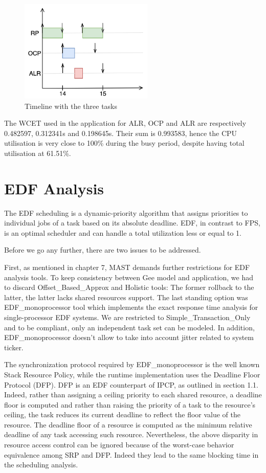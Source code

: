 \documentclass{article}
\begin{document}
\begin{figure}[!htbp]
\centering
\includegraphics[width=2.5in]{images/critical-instant}
\caption{Timeline with the three tasks}
\label{critical-instant}
\end{figure}

The WCET used in the application for ALR, OCP and ALR are respectively 0.482597, 0.312341s and 0.198645s. Their sum is 0.993583, hence the CPU utilisation is very close to 100\% during the busy period, despite having total utilisation at 61.51\%.

\section{EDF Analysis}

The EDF scheduling is a dynamic-priority algorithm that assigns priorities to individual jobs of a task based on its absolute deadline.
EDF, in contrast to FPS, is an optimal scheduler and can handle a total utilization less or equal to 1.

Before we go any further, there are two issues to be addressed.

First, as mentioned in chapter 7, MAST demands further restrictions for EDF analysis tools. 
To keep consistency between Gee model and application, we had to discard Offset_Based_Approx and Holistic tools:
The former rollback to the latter, the latter lacks shared resources support.
The last standing option was EDF_monoprocessor tool which implements the exact response time analysis for single-processor EDF systems.
We are restricted to Simple_Transaction_Only and to be compliant, only an independent task set can be modeled.
In addition, EDF_monoprocessor doesn't allow to take into account jitter related to system ticker.

The synchronization protocol required by EDF_monoprocessor is the well known Stack Resource Policy, while the runtime implementation uses the Deadline Floor Protocol (DFP).
DFP is an EDF counterpart of IPCP, as outlined in section 1.1.
Indeed, rather than assigning a ceiling priority to each shared resource, a deadline ﬂoor is computed and rather than raising the priority of a task to the resource's ceiling,
the task reduces its current deadline to reﬂect the ﬂoor value of the resource.
The deadline floor of a resource is computed as the minimum relative deadline of any task accessing such resource.
Nevertheless, the above disparity in resource access control can be ignored because of the worst-case behavior equivalence among SRP and DFP. 
Indeed they lead to the same blocking time in the scheduling analysis.
\end{document}
